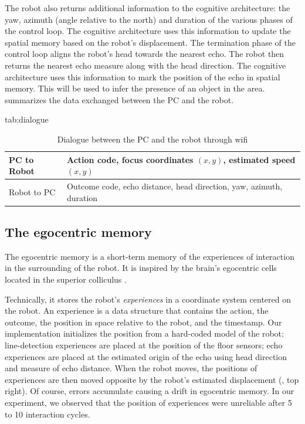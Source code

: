 \documentclass[pmlr]{jmlr}%
\begin{document}
The robot also returns additional information to the cognitive architecture: the yaw, azimuth (angle relative to the north) and duration of the various phases of the control loop. 
The cognitive architecture uses this information to update the spatial memory based on the robot's displacement. 
The termination phase of the control loop aligns the robot's head towards the nearest echo. 
The robot then returns the nearest echo measure along with the head direction. 
The cognitive architecture uses this information to mark the position of the echo in spatial memory. 
This will be used to infer the presence of an object in the area. 
 summarizes the data exchanged between the PC and the robot.

\begin{table}[htbp]
	\floatconts
	{tab:dialogue}%
	{\caption{Dialogue between the PC and the robot through wifi}}%
	{\begin{tabular}{l|l}
			\toprule
			PC to Robot & Action code, focus coordinates $(x, y)$, estimated speed $(x, y)$\\
			\midrule
			Robot to PC & Outcome code, echo distance, head direction, yaw, azimuth, duration\\
			\bottomrule
	\end{tabular}}
\end{table}

\subsection{The egocentric memory}

The egocentric memory is a short-term memory of the experiences of interaction in the surrounding of the robot. 
It is inspired by the brain's egocentric cells located in the superior colliculus \citep{grieves_representation_2017}.

Technically, it stores the robot's \textit{experiences} in a coordinate system centered on the robot.
An experience is a data structure that contains the action, the outcome, the position in space relative to the robot, and the timestamp. 
Our implementation initializes the position from a hard-coded model of the robot: line-detection experiences are placed at the position of the floor sensors; echo experiences are placed at the estimated origin of the echo using head direction and measure of echo distance.  
When the robot moves, the positions of experiences are then moved opposite by the robot's estimated displacement (, top right). 
Of course, errors accumulate causing a drift in egocentric memory. 
In our experiment, we observed that the position of experiences were unreliable after 5 to 10 interaction cycles.
\end{document}
